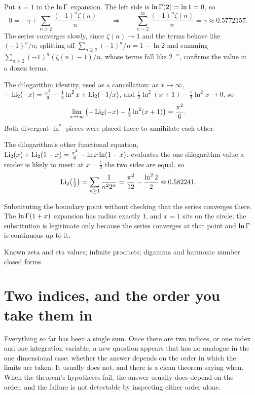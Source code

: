 \begin{worked}
Put $x=1$ in the $\ln\Gamma$ expansion. The left side is $\ln\Gamma(2)=\ln1=0$, so
\[0=-\gamma+\sum_{n\geq2}\frac{(-1)^{n}\zeta(n)}{n}\qquad\Longrightarrow\qquad \sum_{n=2}^{\infty}\frac{(-1)^{n}\zeta(n)}{n}=\gamma\approx0.5772157.\]
The series converges slowly, since $\zeta(n)\to1$ and the terms behave like $(-1)^{n}/n$; splitting off $\sum_{n\geq2}(-1)^{n}/n=1-\ln2$ and summing $\sum_{n\geq2}(-1)^{n}(\zeta(n)-1)/n$, whose terms fall like $2^{-n}$, confirms the value in a dozen terms.

The dilogarithm identity, used as a cancellation: as $x\to\infty$, $-\operatorname{Li}_2(-x)=\tfrac{\pi^{2}}{6}+\tfrac12\ln^{2}x+\operatorname{Li}_2(-1/x)$, and $\tfrac12\ln^{2}(x+1)-\tfrac12\ln^{2}x\to0$, so
\[\lim_{x\to\infty}\left(-\operatorname{Li}_2(-x)-\tfrac12\ln^{2}(x+1)\right)=\frac{\pi^{2}}{6}.\]
Both divergent $\ln^{2}$ pieces were placed there to annihilate each other.
\end{worked}
The dilogarithm's other functional equation, $\operatorname{Li}_2(x)+\operatorname{Li}_2(1-x)=\tfrac{\pi^{2}}{6}-\ln x\ln(1-x)$, evaluates the one dilogarithm value a reader is likely to meet: at $x=\tfrac12$ the two sides are equal, so
\[\operatorname{Li}_2\!\left(\tfrac12\right)=\sum_{n\geq1}\frac{1}{n^{2}2^{n}}=\frac{\pi^{2}}{12}-\frac{\ln^{2}2}{2}\approx0.582241.\]

\begin{trap}
Substituting the boundary point without checking that the series converges there. The $\ln\Gamma(1+x)$ expansion has radius exactly $1$, and $x=1$ sits on the circle; the substitution is legitimate only because the series converges at that point and $\ln\Gamma$ is continuous up to it.
\end{trap}

\begin{seealsob}Known zeta and eta values; infinite products; digamma and harmonic number closed forms.\end{seealsob}

\section{Two indices, and the order you take them in}

Everything so far has been a single sum. Once there are two indices, or one index and one integration variable, a new question appears that has no analogue in the one dimensional case: whether the answer depends on the order in which the limits are taken. It usually does not, and there is a clean theorem saying when. When the theorem's hypotheses fail, the answer usually does depend on the order, and the failure is not detectable by inspecting either order alone.

